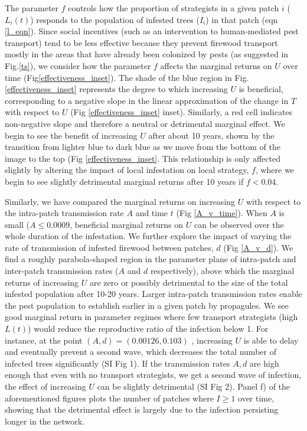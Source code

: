 The parameter $f$ controls how the proportion of strategists in a given patch $i$ ($L_i(t)$) responds to the population of infested trees ($I_i$) in that patch (eqn \ref{l_eqn}). Since social incentives (such as an intervention to human-mediated pest transport) tend to be less effective because they prevent firewood transport mostly in the areas that have already been colonized by pests (as suggested in Fig.\ref{ts}), we consider how the parameter $f$ affects the marginal returns on $U$ over time (Fig\ref{effectiveness_inset}). The shade of the blue region in Fig.\ref{effectiveness_inset} represents the degree to which increasing $U$ is beneficial, corresponding to a negative slope in the linear approximation of the change in $T$ with respect to $U$ (Fig \ref{effectiveness_inset} inset). Similarly, a red cell indicates non-negative slope and therefore a neutral or detrimental marginal effect. We begin to see the benefit of increasing $U$ after about 10 years, shown by the transition from lighter blue to dark blue as we move from the bottom of the image to the top (Fig \ref{effectiveness_inset}. This relationship is only affected slightly by altering the impact of local infestation on local strategy, $f$, where we begin to see slightly detrimental marginal returns after 10 years if $f < 0.04$.

Similarly, we have compared the marginal returns on increasing $U$ with respect to the intra-patch transmission rate $A$ and time $t$ (Fig \ref{A_v_time}). When $A$ is small ($A \leq 0.0009$, beneficial marginal returns on $U$ can be observed over the whole duration of the infestation. We further explore the impact of varying the rate of transmission of infested firewood between patches, $d$ (Fig \ref{A_v_d}). We find a roughly parabola-shaped region in the parameter plane of intra-patch and inter-patch transmission rates ($A$ and $d$ respectively), above which the marginal returns of increasing $U$ are zero or possibly detrimental to the size of the total infested population after 10-20 years. Larger intra-patch transmission rates enable the pest population to establish earlier in a given patch by propagules. We see good marginal return in parameter regimes where few transport strategists (high $L(t)$) would reduce the reproductive ratio of the infection below 1. For instance, at the point $(A,d) = (0.00126,0.103)$ , increasing $U$ is able to delay and eventually prevent a second wave, which decreases the total number of infected trees significantly (SI Fig 1). If the transmission rates $A,d$ are high enough that even with no transport strategists, we get a second wave of infection, the effect of increasing $U$ can be slightly detrimental (SI Fig 2). Panel f) of the aforementioned figures plots the number of patches where $I \geq 1$ over time, showing that the detrimental effect is largely due to the infection persisting longer in the network. 


